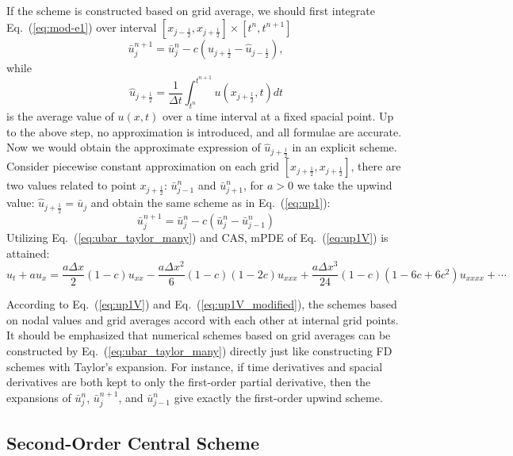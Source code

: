 \documentclass[]{article}
\newcommand{\diff}{d}
\def\jph{{j+\frac{1}{2}}}
\def\jmh{{j-\frac{1}{2}}}
\begin{document}
If the scheme is constructed based on grid average, we should first
integrate Eq.~(\ref{eq:mod-e1}) over interval
$[x_{\jmh},x_{\jph}]\times [t^n,t^{n+1}]$
\begin{equation}
\bar u_j^{n+1}  = \bar u_j^n -c \left( \hat u_{\jph}-\hat u_{\jmh} \right),
\label{eq:wave_integral}
\end{equation}
while
\begin{equation}
\hat u_{\jph} =\frac{1}{\Delta t} \int_{t^n}^{t^{n+1}} u(x_{\jph},t) \diff t
\label{eq:u_integral}
\end{equation}
is the average value of $u(x,t)$ over a time interval at a fixed
spacial point. Up to the above step, no approximation is introduced, and
all formulae are accurate. Now we would obtain the approximate
expression of $\hat u_{\jph}$ in an explicit scheme. Consider piecewise
constant approximation on each grid $[x_{\jph}, x_{\jph}]$, there are
two values related to point $x_{\jph}$: $\bar u_{j-1}^n$ and
$\bar u_{j+1}^n$, for $a>0$ we take the upwind value:
$\hat u_{\jph}=\bar u_j$ and obtain the same scheme as in
Eq.~(\ref{eq:up1}):
\begin{equation}
\bar u_j^{n+1}=\bar u_j^n-c(\bar u_j^n-\bar u_{j-1}^n)
\label{eq:up1V} 
\end{equation}
Utilizing Eq.~(\ref{eq:ubar_taylor_many}) and CAS, mPDE
of Eq.~(\ref{eq:up1V}) is attained:
\begin{equation}
u_t+au_x = \frac{a\Delta x}{2}(1-c)u_{xx} -
\frac{a\Delta x^2}{6}(1-c)(1-2c)u_{xxx} +
\frac{a\Delta x^3}{24}(1-c)(1-6c+6c^2)u_{xxxx}+\cdots
\label{eq:up1V_modified}
\end{equation}

According to Eq.~(\ref{eq:up1V}) and Eq.~(\ref{eq:up1V_modified}), the
schemes based on nodal values and grid averages accord with each other
at internal grid points. It should be emphasized that numerical
schemes based on grid averages can be constructed by
Eq.~(\ref{eq:ubar_taylor_many}) directly just like constructing FD
schemes with Taylor's expansion. For instance, if time derivatives and
spacial derivatives are both kept to only the first-order partial
derivative, then the expansions of $\bar u^n_{j}$, $\bar u^{n+1}_{j}$, and
$\bar u^n_{j-1}$ give exactly the first-order upwind scheme.

\subsection{Second-Order Central Scheme} \label{sec:second-order-central}
\end{document}
